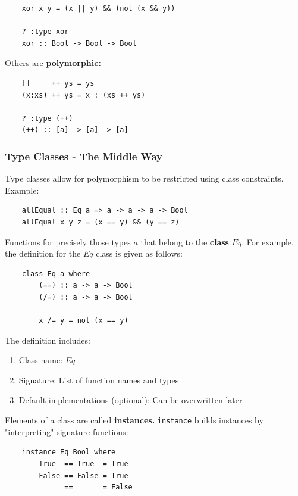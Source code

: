 \documentclass[a4paper]{extarticle}
\begin{document}
\begin{verbatim}
    xor x y = (x || y) && (not (x && y))

    ? :type xor
    xor :: Bool -> Bool -> Bool
\end{verbatim}

Others are \textbf{polymorphic:}

\begin{verbatim}
    []     ++ ys = ys
    (x:xs) ++ ys = x : (xs ++ ys)

    ? :type (++)
    (++) :: [a] -> [a] -> [a]
\end{verbatim}

\subsubsection{Type Classes - The Middle Way}

Type classes allow for polymorphism to be restricted using class constraints. Example:

\begin{verbatim}
    allEqual :: Eq a => a -> a -> a -> Bool
    allEqual x y z = (x == y) && (y == z)
\end{verbatim}

Functions for precisely those types \(a\) that belong to the \textbf{class} \(Eq\). For example, the definition for the \(Eq\) class is given as follows:

\begin{verbatim}
    class Eq a where
        (==) :: a -> a -> Bool
        (/=) :: a -> a -> Bool

        x /= y = not (x == y)
\end{verbatim}

The definition includes:

\begin{enumerate}
    \item Class name: \(Eq\)
    \item Signature: List of function names and types
    \item Default implementations (optional): Can be overwritten later
\end{enumerate}

Elements of a class are called \textbf{instances.} \verb|instance| builds instances by "interpreting" signature functions:

\begin{verbatim}
    instance Eq Bool where
        True  == True  = True
        False == False = True
        _     == _     = False
\end{verbatim}
\end{document}
